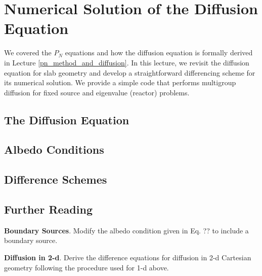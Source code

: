 
\chapter{Numerical Solution of the Diffusion Equation}
\label{app:diffusion}

We covered the $P_N$ equations and how the diffusion equation is formally derived in Lecture \ref{pn_method_and_diffusion}.  In this lecture, we revisit the diffusion equation for slab geometry and develop a straightforward differencing scheme for its numerical solution.  We provide a simple code that performs multigroup diffusion for fixed source and eigenvalue (reactor) problems.

\section*{The Diffusion Equation}

\section*{Albedo Conditions}

\section*{Difference Schemes}

\section*{Further Reading}



\begin{exercises}

  \item \textbf{Boundary Sources}.  Modify the albedo condition given in Eq. ?? to include a boundary source. 

  \item \textbf{Diffusion in 2-d}.  Derive the difference equations for diffusion in 2-d Cartesian geometry following the procedure used for 1-d above.

\end{exercises}
